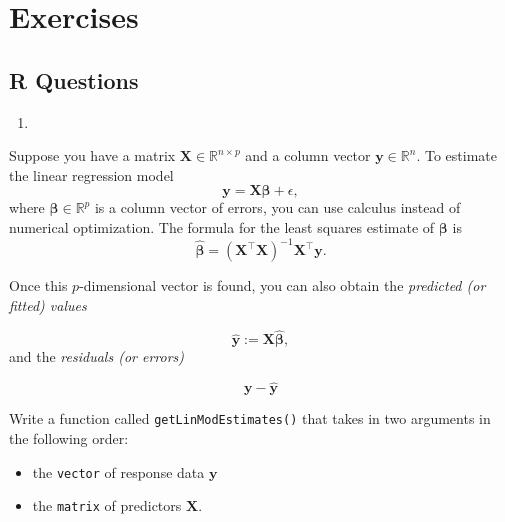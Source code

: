 \documentclass[
  12pt,
  krantz2]{krantz}
\providecommand{\tightlist}{%
  \setlength{\itemsep}{0pt}\setlength{\parskip}{0pt}}
\begin{document}
\hypertarget{exercises-4}{%
\section{Exercises}\label{exercises-4}}

\hypertarget{r-questions-4}{%
\subsection{R Questions}\label{r-questions-4}}

\begin{enumerate}
\def\labelenumi{\arabic{enumi}.}
\tightlist
\item
\end{enumerate}

Suppose you have a matrix \(\mathbf{X} \in \mathbb{R}^{n \times p}\) and a column vector \(\mathbf{y} \in \mathbb{R}^{n}\). To estimate the linear regression model
\begin{equation} 
\mathbf{y} = \mathbf{X}\boldsymbol{\beta} + \epsilon,
\end{equation}
where \(\boldsymbol{\beta} \in \mathbb{R}^p\) is a column vector of errors, you can use calculus instead of numerical optimization. The formula for the least squares estimate of \(\boldsymbol{\beta}\) is
\begin{equation} 
\hat{\boldsymbol{\beta}} = (\mathbf{X}^\intercal \mathbf{X})^{-1} \mathbf{X}^\intercal \mathbf{y}.
\end{equation}

Once this \(p\)-dimensional vector is found, you can also obtain the \emph{predicted (or fitted) values}

\begin{equation} 
\hat{\mathbf{y}} := \mathbf{X}\hat{\boldsymbol{\beta}},
\end{equation}
and the \emph{residuals (or errors)}

\begin{equation} 
\mathbf{y} - \hat{\mathbf{y}}
\end{equation}

Write a function called \texttt{getLinModEstimates()} that takes in two arguments in the following order:

\begin{itemize}
\tightlist
\item
  the \texttt{vector} of response data \(\mathbf{y}\)
\item
  the \texttt{matrix} of predictors \(\mathbf{X}\).
\end{itemize}
\end{document}
